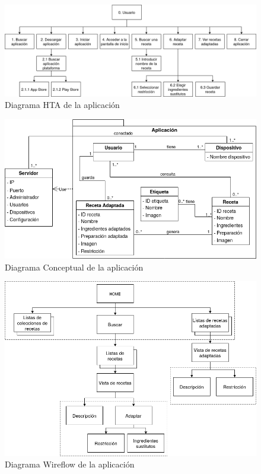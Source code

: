 \begin{figure}[H]
    \centering
    \includegraphics[width=1.0\textwidth]{imagenes/app/diagramas/diagrama-hta.png}
    \caption{Diagrama HTA de la aplicación}
    \label{fig:diagramahta}
\end{figure}



\begin{figure}[H]
    \centering
    \includegraphics[width=1.0\textwidth]{imagenes/app/diagramas/diagrama_conceptual.png}
    \caption{Diagrama Conceptual de la aplicación}
    \label{fig:diagrama_conceptual}
\end{figure}


\begin{figure}[H]
    \centering
    \includegraphics[width=1.0\textwidth]{imagenes/app/diagramas/Wireflow.png}
    \caption{Diagrama Wireflow de la aplicación}
    \label{fig:diagrama_wireflow}
\end{figure}

